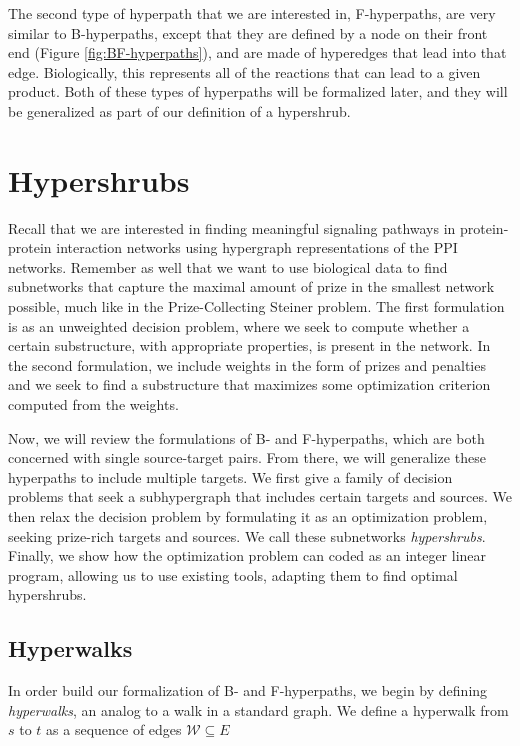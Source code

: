 \documentclass[12pt,twoside]{reedthesis}
\theoremstyle{definition}
\begin{document}
The second type of hyperpath that we are interested in, F-hyperpaths, are very similar to B-hyperpaths, except that they are defined by a node on their front end (Figure \ref{fig:BF-hyperpaths}), and are made of hyperedges that lead into that edge. Biologically, this represents all of the reactions that can lead to a given product. Both of these types of hyperpaths will be formalized later, and they will be generalized as part of our definition of a hypershrub.

\chapter{Hypershrubs}

Recall that we are interested in finding meaningful signaling pathways in protein-protein interaction networks using hypergraph representations of the PPI networks. Remember as well that we want to use biological data to find subnetworks that capture the maximal amount of prize in the smallest network possible, much like in the Prize-Collecting Steiner problem. The first formulation is as an unweighted decision problem, where we seek to compute whether a certain substructure, with appropriate properties, is present in the network. In the second formulation, we include weights in the form of prizes and penalties and we seek to find a substructure that maximizes some optimization criterion computed from the weights.\par

Now, we will review the formulations of B- and F-hyperpaths, which are both concerned with single source-target pairs. From there, we will generalize these hyperpaths to include multiple targets. We first give a family of decision problems that seek a subhypergraph that includes certain targets and sources. We then relax the decision problem by formulating it as an optimization problem, seeking prize-rich targets and sources. We call these subnetworks \textit{hypershrubs}. Finally, we show how the optimization problem can coded as an integer linear program, allowing us to use existing tools, adapting them to find optimal hypershrubs.\par

\section{Hyperwalks}
In order build our formalization of B- and F-hyperpaths, we begin by defining \textit{hyperwalks}, an analog to a walk in a standard graph. We define a hyperwalk from $s$ to $t$ as a sequence of edges $\mathcal{W} \subseteq E$
\end{document}
